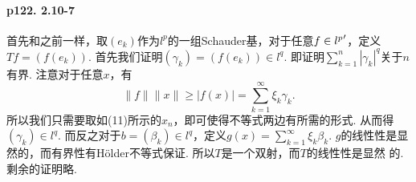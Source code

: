   \paragraph{p122. 2.10-7}
    首先和之前一样，取$(e_k)$作为$l^p$的一组Schauder基，对于任意$f\in {l^p}^\prime$，定义$
    Tf=(f(e_k))$. 首先我们证明$(\gamma_k)=(f(e_k))\in l^q$. 即证明$\sum_{k=1}^n|
    \gamma_k|^q$关于$n$有界. 注意对于任意$x$，有
    \[
      \|f\|\|x\| \ge |f(x)| = \sum_{k=1}^\infty \xi_k\gamma_k.
    \]
    所以我们只需要取如(11)所示的$x_n$，即可使得不等式两边有所需的形式. 从而得$(\gamma_k)\in
    l^q$. 而反之对于$b=(\beta_k)\in l^q$，定义$g(x)=\sum_{k=1}^\infty\xi_k\beta_k$.
    $g$的线性性是显然的，而有界性有Hölder不等式保证. 所以$T$是一个双射，而$T$的线性性是显然
    的. 剩余的证明略. 


